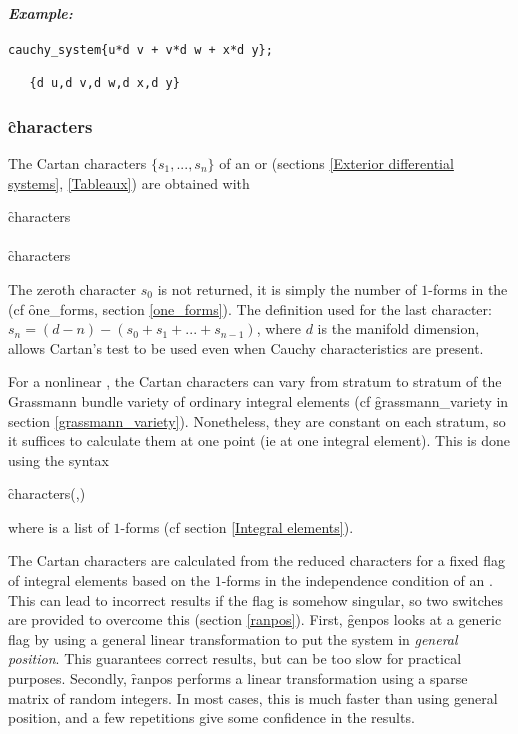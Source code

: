 \paragraph{\textit{Example:}}
\begin{verbatim}
cauchy_system{u*d v + v*d w + x*d y};

   {d u,d v,d w,d x,d y}
\end{verbatim}

\subsubsection{\f{characters}}
\label{characters}

\hypertarget{operator:CHARACTERS}{}
The Cartan characters $\{s_1,...,s_n\}$ of an  or 
(sections \ref{Exterior differential systems}, \ref{Tableaux}) are obtained
with
\begin{syntaxtable}
  \f{characters} \\
  \\
  \f{characters} 
\end{syntaxtable}
The zeroth character $s_0$ is not returned, it is simply the number of
$1$-forms in the  (cf \f{one\_forms}, section \ref{one_forms}). The
definition used for the last character: $s_n = (d - n) - (s_0 + s_1 + ... +
s_{n-1})$, where $d$ is the manifold dimension, allows Cartan's test to be
used even when Cauchy characteristics are present.

For a nonlinear , the Cartan characters can vary from stratum to
stratum of the Grassmann bundle variety of ordinary integral elements (cf
\f{grassmann\_variety} in section \ref{grassmann_variety}). Nonetheless,
they are constant on each stratum, so it suffices to calculate them at one
point (ie at one integral element). This is done using the syntax
\begin{syntax}
	\f{characters}(,)
\end{syntax}
where  is a list of $1$-forms (cf section
\ref{Integral elements}).

The Cartan characters are calculated from the reduced characters for a
fixed flag of integral elements based on the $1$-forms in the independence
condition of an . This can lead to incorrect results if the flag
is somehow singular, so two switches are provided to overcome this (section
\ref{ranpos}). First, \f{genpos} looks at a generic flag by using a general
linear transformation to put the system in \emph{general position}. This
guarantees correct results, but can be too slow for practical
purposes. Secondly, \f{ranpos} performs a linear transformation using a
sparse matrix of random integers. In most cases, this is much faster than
using general position, and a few repetitions give some confidence in the
results.

